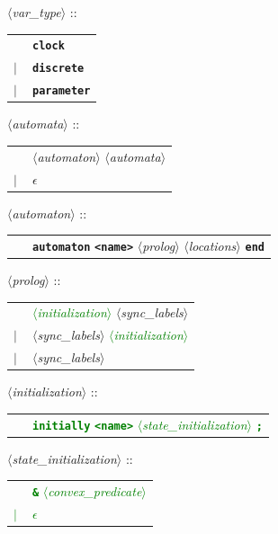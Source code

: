 \documentclass[a4paper,11pt]{article}
\newcommand{\emptystring}{$\epsilon$}
\newcommand{\nt}[1]{$\langle$\emph{#1}$\rangle$}
\newcommand{\regleGrammaire}[1]{\bigskip \noindent \nt{#1} :: \\}
\newcommand{\npec}[1]{\textcolor{green}{#1}}
\newcommand{\code}[1]{\textbf{\texttt{#1}}}
\begin{document}
\regleGrammaire{var\_type}
\begin{tabular}{l l}
	\  & \code{clock} \\
	$|$ & \code{discrete} \\
	$|$ & \code{parameter} \\
\end{tabular}

\regleGrammaire{automata}
\begin{tabular}{l l}
	\  & \nt{automaton} \nt{automata} \\
	$|$ & \emptystring \\
\end{tabular}

\regleGrammaire{automaton}
\begin{tabular}{l l}
	\  & \code{automaton} \code{<name>} \nt{prolog} \nt{locations} \code{end} \\
\end{tabular}

\regleGrammaire{prolog}
\begin{tabular}{l l}
	\  & \npec{\nt{initialization}} \nt{sync\_labels} \\
	$|$ & \nt{sync\_labels} \npec{\nt{initialization}} \\
	$|$ & \nt{sync\_labels} \\
\end{tabular}

\regleGrammaire{initialization}
\npec{
\begin{tabular}{l l}
	\  & \code{initially} \code{<name>} \nt{state\_initialization} \code{;} \\
\end{tabular}
}

\regleGrammaire{state\_initialization}
\npec{
\begin{tabular}{l l}
	\  & \code{\&} \nt{convex\_predicate} \\
	$|$ & \emptystring \\
\end{tabular}
}
\end{document}

